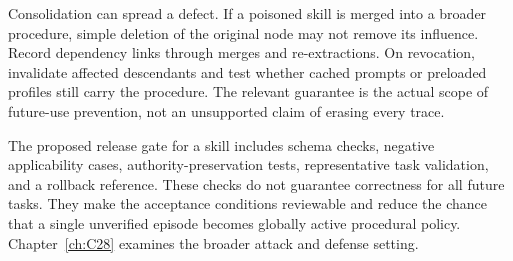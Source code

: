 Consolidation can spread a defect. If a poisoned skill is merged into a broader procedure, simple deletion of the original node may not remove its influence. Record dependency links through merges and re-extractions. On revocation, invalidate affected descendants and test whether cached prompts or preloaded profiles still carry the procedure. The relevant guarantee is the actual scope of future-use prevention, not an unsupported claim of erasing every trace.

The proposed release gate for a skill includes schema checks, negative applicability cases, authority-preservation tests, representative task validation, and a rollback reference. These checks do not guarantee correctness for all future tasks. They make the acceptance conditions reviewable and reduce the chance that a single unverified episode becomes globally active procedural policy. Chapter~\ref{ch:C28} examines the broader attack and defense setting.

